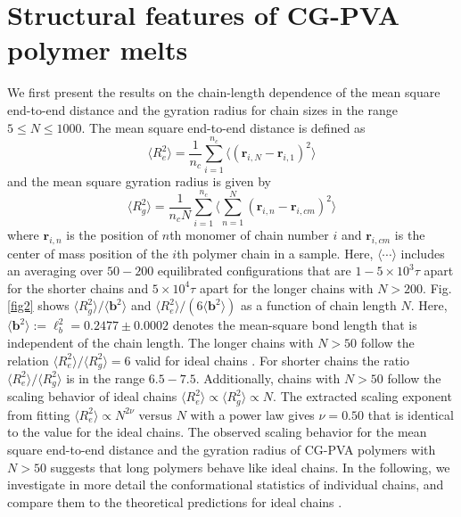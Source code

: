 \documentclass[pre,showpacs,notitlepage,twocolumn]{revtex4-1}
\begin{document}
\section*{Structural features of CG-PVA polymer melts}

We first present the results on the chain-length dependence of the mean square end-to-end distance and the gyration radius for chain sizes in the range $ 5\le N \le 1000$. 
The mean square end-to-end distance is defined as
%
\begin{equation}
 \langle R_e^2 \rangle=\frac{1}{n_c}  \sum_{i=1}^{n_c} \langle(\mathbf{r}_{i,N}-\mathbf{r}_{i,1})^2 \rangle
\end{equation}
and the mean square gyration radius  is given by
\begin{equation}
 \langle R_g^2 \rangle=\frac{1}{n_c N}  \sum_{i=1}^{n_c} \langle \sum_{n=1}^{N} (\mathbf{r}_{i,n}-\mathbf{r}_{i,cm})^2 \rangle
\end{equation}
%
where $\mathbf{r}_{i,n}$ is the position of  $n$th monomer of chain number $i$ and $\mathbf{r}_{i,cm}$ is the center of mass position  of the $i$th polymer chain in a sample. Here,   $\langle \cdots \rangle$  
includes an averaging over $50-200$ equilibrated configurations that are     $1-5 \times 10^3\tau$  apart for the shorter chains and  $5 \times 10^4\tau$ apart for the longer chains with $N>200$. 
Fig. \ref{fig2} shows $\langle R_g^2\rangle/ \langle \mathbf{b}^2 \rangle $ and  $\langle R_e^2\rangle/(6 \langle \mathbf{b}^2 \rangle) $
as a function of chain length $N$.  Here, $\langle \mathbf{b}^2 \rangle:=\ell_b^2=0.2477 \pm 0.0002$  denotes the mean-square bond length  that is  independent of  the chain length.
The longer chains with $N>50$ follow the  relation $\langle R_e^2\rangle/\langle R_g^2\rangle=6$  valid for ideal chains \cite{polymerDeGennes}. For shorter chains the ratio $\langle R_e^2\rangle/\langle R_g^2\rangle$ is in the range $6.5-7.5$.
Additionally, chains with $N > 50$ follow the scaling behavior of ideal chains $\langle R_e^2\rangle \propto \langle R_g^2\rangle \propto  N$. The extracted  scaling exponent from fitting  $\langle R_e^2\rangle \propto N^{2 \nu}$
versus $N$ with a power law  gives $\nu=0.50 $ that is  identical to the value for the ideal chains.
The observed scaling behavior for the  mean square end-to-end distance and the gyration radius  of CG-PVA polymers with $N>50$ suggests that long    polymers behave like ideal chains. 
 In the following, we investigate in more detail the  conformational statistics of individual chains, and compare them to the theoretical predictions for ideal chains \cite{polymerDeGennes,Rubinstein} .
 
\end{document}
